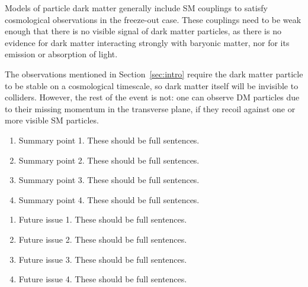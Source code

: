 \documentclass{ar-1col}
\begin{document}

Models of particle dark matter generally include SM couplings to satisfy cosmological observations
in the freeze-out case. These couplings need to be weak enough that there is no visible signal of dark matter particles, as there is no evidence for dark matter interacting strongly with baryonic matter, 
nor for its emission or absorption of light. %

The observations mentioned in Section~\ref{sec:intro} require the dark matter particle
to be stable on a cosmological timescale, so dark matter itself will be
invisible to colliders. However, the rest of the event is not: one can observe DM particles
due to their missing momentum in the transverse plane, if they recoil against one or 
more visible SM particles. 

\clearpage


\begin{summary}
\begin{enumerate}
\item Summary point 1. These should be full sentences.
\item Summary point 2. These should be full sentences.
\item Summary point 3. These should be full sentences.
\item Summary point 4. These should be full sentences.
\end{enumerate}
\end{summary}

\begin{issues}
\begin{enumerate}
\item Future issue 1. These should be full sentences.
\item Future issue 2. These should be full sentences.
\item Future issue 3. These should be full sentences.
\item Future issue 4. These should be full sentences.
\end{enumerate}
\end{issues}
\end{document}
